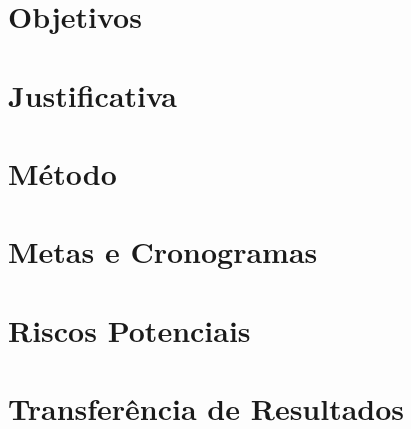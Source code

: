 \documentclass[
12pt,				%
openright,			%
twoside,			%
a4paper,			%
english,			%
french,				%
spanish,			%
brazil				%
]{abntex2}
\begin{document}
\chapter[Objetivos]{Objetivos}
\minitoc


\chapter[Justificativa]{Justificativa}\label{chap:Método}
\minitoc


\chapter[Método]{Método}\label{chap:results}
\minitoc



\chapter[Metas e Cronogramas]{Metas e Cronogramas}\label{chap:Cronograma}
\minitoc


\chapter[Riscos Potenciais]{Riscos Potenciais}\label{chap:Cronograma}
\minitoc



\chapter[Transferência de Resultados]{Transferência de Resultados}\label{chap:Cronograma}
\minitoc

\end{document}
